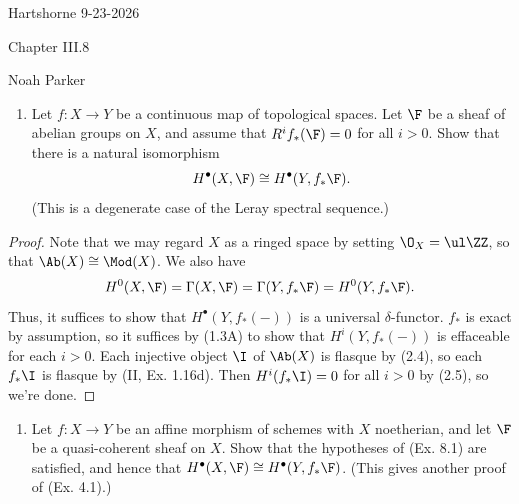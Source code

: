 \documentclass[12pt]{amsart}
\begin{document}
{Hartshorne} \hfill {9-23-2026}

\bigskip\bigskip

\begin{center}

{\sc Chapter III.8}

\end{center}

\begin{center}

  {Noah Parker} 
    
\end{center}

\bigskip\bigskip

\begin{enumerate}
  \item[8.1.] {
      Let $f:X\to Y$ be a continuous map of topological spaces.
      Let $\F$ be a sheaf of abelian groups on $X$, and assume that $R^if_*(\F)=0$ for all $i>0$.
      Show that there is a natural isomorphism
      \[
        H^\bullet(X,\F)\cong H^\bullet(Y,f_*\F).
      \] 
      (This is a degenerate case of the Leray spectral sequence.)
    }
\end{enumerate}

\begin{proof}
  Note that we may regard $X$ as a ringed space by setting $\O_X=\ul \ZZ$, so that $\Ab(X)\cong\Mod(X)$.
  We also have 
  \[
    H^0(X,\F)=\Gamma(X,\F)=\Gamma(Y,f_*\F)= H^0(Y,f_*\F).
  \]
  Thus, it suffices to show that $H^\bullet(Y,f_*(-))$ is a universal $\delta$-functor.
  $f_*$ is exact by assumption, so it suffices by (1.3A) to show that $H^i(Y, f_*(-))$ is effaceable for each $i>0$.
  Each injective object $\I$ of $\Ab(X)$ is flasque by (2.4), so each $f_*\I$ is flasque by (II, Ex. 1.16d).
  Then $H^i(f_*\I)=0$ for all $i>0$ by (2.5), so we're done.
\end{proof}

\begin{enumerate}
  \item[8.2.] {
      Let $f:X\to Y$ be an affine morphism of schemes with $X$ noetherian, and let $\F$ be a quasi-coherent sheaf on $X$.
      Show that the hypotheses of (Ex. 8.1) are satisfied, and hence that $H^\bullet(X,\F)\cong H^\bullet(Y,f_*\F)$.
      (This gives another proof of (Ex. 4.1).)
    }
\end{enumerate}
\end{document}
